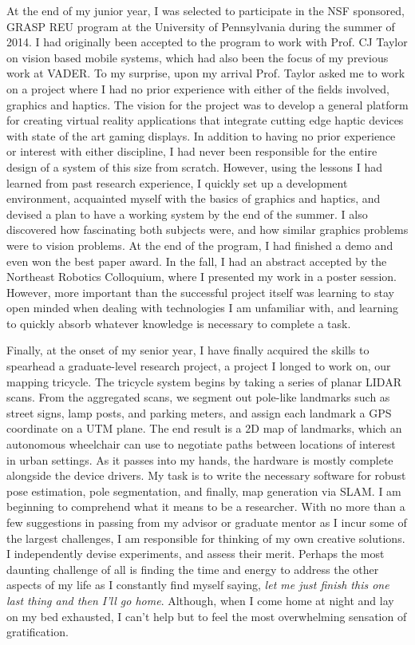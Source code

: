 \documentclass{article}
\begin{document}
\clearpage

At the end of my junior year, I was selected to participate in the NSF
sponsored, GRASP REU program at the University of Pennsylvania during the
summer of 2014. I had originally been accepted to the program to work with
Prof. CJ Taylor on vision based mobile systems, which had also been the focus
of my previous work at VADER. To my surprise, upon my arrival Prof. Taylor
asked me to work on a project where I had no prior experience with either of
the fields involved, graphics and haptics. The vision for the project was to
develop a general platform for creating virtual reality applications that
integrate cutting edge haptic devices with state of the art gaming displays.
In addition to having no prior experience or interest with either discipline, I
had never been responsible for the entire design of a system of this size from
scratch.  However, using the lessons I had learned from past research
experience, I quickly set up a development environment, acquainted myself with
the basics of graphics and haptics, and devised a plan to have a working system
by the end of the summer. I also discovered how fascinating both subjects were,
and how similar graphics problems were to vision problems. At the end of the
program, I had finished a demo and even won the best paper award. In the fall,
I had an abstract accepted by the Northeast Robotics Colloquium, where I
presented my work in a poster session.  However, more important than the
successful project itself was learning to stay open minded when dealing with
technologies I am unfamiliar with, and learning to quickly absorb whatever
knowledge is necessary to complete a task.

Finally, at the onset of my senior year, I have finally acquired the skills to
spearhead a graduate-level research project, a project I longed to work on, our
mapping tricycle. The tricycle system begins by taking a series of planar LIDAR
scans. From the aggregated scans, we segment out pole-like landmarks such as
street signs, lamp posts, and parking meters, and assign each landmark a GPS
coordinate on a UTM plane.  The end result is a 2D map of landmarks, which an
autonomous wheelchair can use to negotiate paths between locations of interest
in urban settings. As it passes into my hands, the hardware is mostly complete
alongside the device drivers. My task is to write the necessary software for
robust pose estimation, pole segmentation, and finally, map generation via
SLAM. I am beginning to comprehend what it means to be a researcher. With no
more than a few suggestions in passing from my advisor or graduate mentor as I
incur some of the largest challenges, I am responsible for thinking of my own
creative solutions. I independently devise experiments, and assess their merit.
Perhaps the most daunting challenge of all is finding the time  and energy to
address the other aspects of my life as I constantly find myself saying,
\emph{let me just finish this one last thing and then I'll go home}. Although,
when I come home at night and lay on my bed exhausted, I can't help but to feel
the most overwhelming sensation of gratification.
\end{document}
